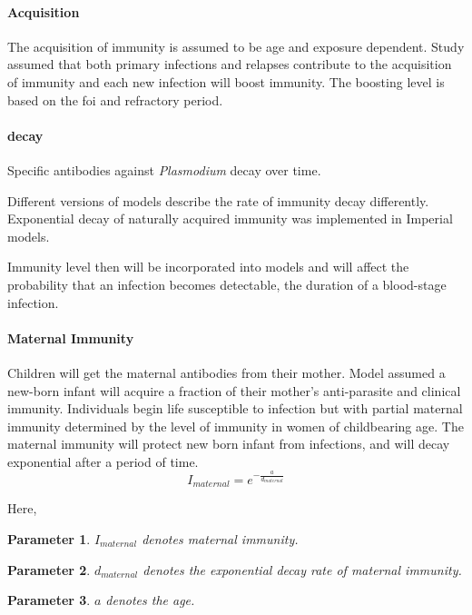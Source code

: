 \documentclass[a4paper, 12pt, twoside]{article}
\newtheorem{parameter}{Parameter}
\begin{document}
\paragraph{Acquisition}%
\label{par:acquisition}
The acquisition of immunity is assumed to be age and exposure dependent.
Study\cite{White2018b} assumed that both primary infections and relapses contribute to the acquisition of immunity and each new infection will boost immunity.
The boosting level is based on the \gls{foi} and refractory period.

\paragraph{decay}%
\label{par:decay}
Specific antibodies against \textit{Plasmodium} decay over time.

Different versions of models describe the rate of immunity decay differently.
Exponential decay of naturally acquired immunity was implemented in Imperial models.


Immunity level then will be incorporated into models and will affect the probability that an infection becomes detectable, the duration of a blood-stage infection.
\paragraph{Maternal Immunity}%
\label{subsec:maternal_immunity}
Children will get the maternal antibodies from their mother.
Model assumed a new-born infant will acquire a fraction of their mother’s anti-parasite and clinical immunity.
Individuals begin life susceptible to infection but with partial maternal immunity determined by the level of immunity in women of childbearing age.
The maternal immunity will protect new born infant from infections, and will decay exponential after a period of time.
\begin{equation}
	I_{maternal} = e^{- \frac{a}{d_{maternal}}}
\end{equation}

Here,

\begin{parameter}
	{$I_{maternal}$}
	{denotes maternal immunity.}
\end{parameter}
\begin{parameter}
	{$d_{maternal}$}
	{denotes the exponential decay rate of maternal immunity.}
\end{parameter}
\begin{parameter}
	{$a$}
	{denotes the age.}
\end{parameter}
\end{document}
